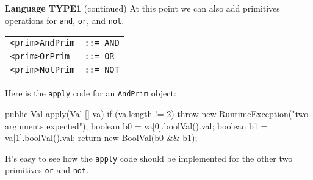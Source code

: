 \begin{minipage}[t]{\sw}
\slidenumber
\LARGE
{\bf Language TYPE1} (continued)\exx
\Large
At this point we can also add primitives operations
for \verb'and', \verb'or', and \verb'not'.\exx
\emm\begin{tabular}{ll}
\verb'<prim>AndPrim' & \verb'::= AND'\\
\verb'<prim>OrPrim' & \verb'::= OR'\\
\verb'<prim>NotPrim' & \verb'::= NOT'\\
\end{tabular}\exx
Here is the \verb'apply' code for an \verb'AndPrim' object:
\begin{qv}
public Val apply(Val [] va) {
    if (va.length != 2)
        throw new RuntimeException("two arguments expected");
    boolean b0 = va[0].boolVal().val;
    boolean b1 = va[1].boolVal().val;
    return new BoolVal(b0 && b1);
}
\end{qv}
It's easy to see how the \verb'apply' code should be implemented
for the other two primitives \verb'or' and \verb'not'.
\end{minipage}

